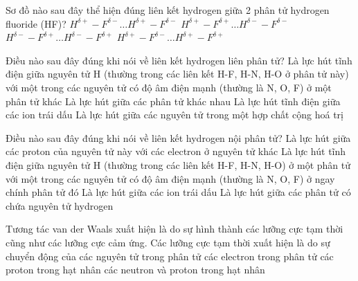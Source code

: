 \begin{ex}
	Sơ đồ nào sau đây thể hiện đúng liên kết hydrogen giữa 2 phân tử hydrogen
	fluoride (HF)?
	\choice
	{\True $H^{\delta+}-F^{\delta-}\ldots H^{\delta+}-F^{\delta-}$}
	{$H^{\delta+}-F^{\delta+}\ldots H^{\delta-}-F^{\delta-}$}
	{$H^{\delta-}-F^{\delta+}\ldots H^{\delta-}-F^{\delta+}$}
	{$H^{\delta+}-F^{\delta-}\ldots H^{\delta+}-F^{\delta+}$}
	\loigiai{}
\end{ex}

\begin{ex}
	Điều nào sau đây đúng khi nói về liên kết hydrogen liên phân tử?
	\choice
	{\True Là lực hút tĩnh điện giữa nguyên tử H (thường trong các liên kết H-F, H-N, H-O ở phân tử này) với một trong các nguyên tử có độ âm điện mạnh
		(thường là N, O, F) ở một phân tử khác}
	{Là lực hút giữa các phân tử khác nhau}
	{Là lực hút tĩnh điện giữa các ion trái dấu}
	{Là lực hút giữa các nguyên tử trong một hợp chất cộng hoá trị}
\end{ex}

\begin{ex}
	Điều nào sau đây đúng khi nói về liên kết hydrogen nội phân tử?
	\choice
	{Là lực hút giữa các proton của nguyên tử này với các electron ở nguyên tử khác}
	{\True Là lực hút tĩnh điện giữa nguyên tử H (thường trong các liên kết H-F, H-N, H-O) ở một phân tử với một trong các nguyên tử có độ âm điện mạnh (thường là N, O, F) ở ngay chính phân tử đó}
	{Là lực hút giữa các ion trái dấu}
	{Là lực hút giữa các phân tử có chứa nguyên tử hydrogen}
\end{ex}

\begin{ex}
	Tương tác van der Waals xuất hiện là do sự hình thành các lưỡng cực tạm thời cũng như các lưỡng cực cảm ứng. Các lưỡng cực tạm thời xuất hiện là do sự chuyển động của
	\choice
	{các nguyên tử trong phân tử}
	{\True các electron trong phân tử}
	{các proton trong hạt nhân}
	{các neutron và proton trong hạt nhân}
\end{ex}

